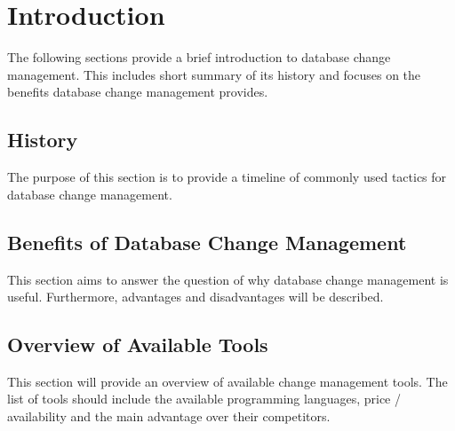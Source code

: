 

\chapter{Introduction}

The following sections provide a brief introduction to database change
management. This includes short summary of its history and focuses on
the benefits database change management provides.

\section{History}%
The purpose of this section is to provide a timeline of commonly used
tactics for database change management.

\section{Benefits of Database Change Management}%
This section aims to answer the question of why database change
management is useful.
Furthermore, advantages and disadvantages will be described.

\section{Overview of Available Tools}%
This section will provide an overview of available change management tools.
The list of tools should include the available programming languages, price / availability
and the main advantage over their competitors.


\newpage